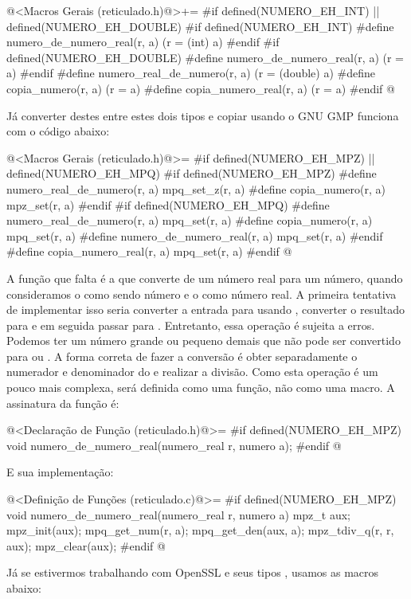 \iniciocodigo
@<Macros Gerais (reticulado.h)@>+=
#if defined(NUMERO_EH_INT) || defined(NUMERO_EH_DOUBLE)
#if defined(NUMERO_EH_INT)
#define numero_de_numero_real(r, a) (r = (int) a)
#endif
#if defined(NUMERO_EH_DOUBLE)
#define numero_de_numero_real(r, a) (r = a)
#endif
#define numero_real_de_numero(r, a) (r = (double) a)
#define copia_numero(r, a) (r = a)
#define copia_numero_real(r, a) (r = a)
#endif
@
\fimcodigo

Já converter destes entre estes dois tipos e copiar usando o GNU GMP
funciona com o código abaixo:

\iniciocodigo
@<Macros Gerais (reticulado.h)@>=
#if defined(NUMERO_EH_MPZ) || defined(NUMERO_EH_MPQ)
#if defined(NUMERO_EH_MPZ)
#define numero_real_de_numero(r, a) mpq_set_z(r, a)
#define copia_numero(r, a) mpz_set(r, a)
#endif
#if defined(NUMERO_EH_MPQ)
#define numero_real_de_numero(r, a) mpq_set(r, a)
#define copia_numero(r, a) mpq_set(r, a)
#define numero_de_numero_real(r, a) mpq_set(r, a)
#endif
#define copia_numero_real(r, a) mpq_set(r, a)
#endif
@
\fimcodigo

A função que falta é a que converte de um número real para um número,
quando consideramos o  como sendo número e
o  como número real. A primeira tentativa de
implementar isso seria converter a entrada para 
usando , converter o resultado
para  e em seguida passar
para . Entretanto, essa operação é sujeita a
erros. Podemos ter um número grande ou pequeno demais que não pode ser
convertido para  ou . A
forma correta de fazer a conversão é obter separadamente o numerador e
denominador do  e realizar a divisão. Como esta
operação é um pouco mais complexa, será definida como uma função, não
como uma macro. A assinatura da função é:

\iniciocodigo
@<Declaração de Função (reticulado.h)@>=
#if defined(NUMERO_EH_MPZ)
void numero_de_numero_real(numero_real r, numero a);
#endif
@
\fimcodigo

E sua implementação:

\iniciocodigo
@<Definição de Funções (reticulado.c)@>=
#if defined(NUMERO_EH_MPZ)
void numero_de_numero_real(numero_real r, numero a){
  mpz_t aux;
  mpz_init(aux);
  mpq_get_num(r, a);
  mpq_get_den(aux, a);
  mpz_tdiv_q(r, r, aux);
  mpz_clear(aux);
}
#endif
@
\fimcodigo

Já se estivermos trabalhando com OpenSSL e seus tipos ,
usamos as macros abaixo:

